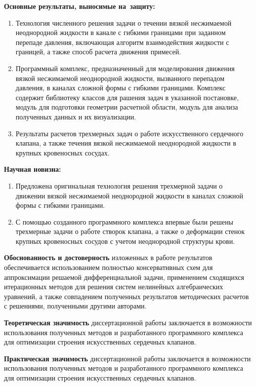 \textbf{Основные результаты, выносимые на~защиту:}
\begin{enumerate}
 \item Технология численного решения задачи о течении вязкой несжимаемой
     неоднородной жидкости в канале с гибкими границами при заданном перепаде
     давления, включающая алгоритм взаимодействия жидкости с границей, а также
     способ расчета движения примесей.
 \item Программный комплекс, предназначенный для моделирования движения вязкой
     несжимаемой неоднородной жидкости, вызванного перепадом давления, в
     каналах сложной формы с гибкими границами. Комплекс содержит библиотеку
     классов для рашения задач в указанной постановке, модуль для подготовки
     геометрии расчетной области, модуль для анализа полученных данных и их
     визуализации.
 \item Результаты расчетов трехмерных задач о работе искусственного сердечного
     клапана, а также течения вязкой несжимаемой неоднородной жидкости в
     крупных кровеносных сосудах.
\end{enumerate}

\textbf{Научная новизна:}
\begin{enumerate}
 \item Предложена оригинальная технология решения трехмерной задачи о движении
     вязкой несжимаемой неоднородной жидкости в каналах сложной формы с гибкими
     границами.
 \item С помощью созданного программного комплекса впервые были решены
     трехмерные задачи о работе створок клапана, а также о деформации стенок
     крупных кровеносных сосудов с учетом неоднородной структуры крови.
\end{enumerate}

\textbf{Обоснованность и достоверность} изложенных в работе результатов
обеспечивается использованием полностью консервативных схем для аппроксимации
решаемой дифференциальной задачи, применением сходящихся итерационных методов
для решения систем нелинейных алгебраических уравнений, а также совпадением
полученных результатов методических расчетов с решениями, полученными другими
авторами.

\textbf{Теоретическая значимость} диссертационной работы заключается в
возможности использования полученных методов и разработанного программного
комплекса для оптимизации строения искусственных сердечных клапанов.

\textbf{Практическая значимость} диссертационной работы заключается в
возможности использования полученных методов и разработанного программного
комплекса для оптимизации строения искусственных сердечных клапанов.

